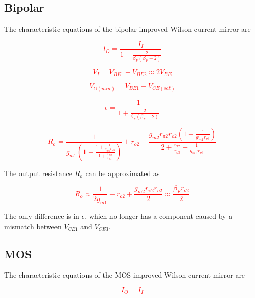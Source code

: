 \subsection{Bipolar}
The characteristic equations of the bipolar improved Wilson current mirror are

\textcolor{red}{
\begin{equation}I_{O} = \frac{I_{I}}{1+\frac{2}{\beta_{F} (\beta_{F} + 2)}}
\end{equation}
}

\textcolor{red}{
\begin{equation}
V_{I}= V_{BE1} + V_{BE2} \approx 2V_{BE}
\end{equation}
}

\textcolor{red}{
\begin{equation}
V_{O(min)} = V_{BE1} + V_{CE(sat)}
\end{equation}
}

\textcolor{red}{
\begin{equation}
\epsilon = \frac{1}{1+\frac{2}{\beta_{F} (\beta_{F} + 2)}}
\end{equation}
}

\textcolor{red}{
\begin{equation}
R_{o} = \frac{1}{g_{m1}\left(1 + \frac{1+\frac{1}{g_{m1}r_{o3}}}{1+\frac{r_{\pi2}}{r_{o3}}}\right)} + r_{o2} + \frac{g_{m2}r_{\pi2}r_{o2}\left(1+\frac{1}{g_{m1}r_{o3}}\right)}{2 + \frac{r_{\pi2}}{r_{o3}} + \frac{1}{g_{m1}r_{o3}}}
\end{equation}
}

The output resistance $R_{o}$ can be approximated as

\textcolor{red}{
\begin{equation}
R_{o} \approx \frac{1}{2g_{m1}} + r_{o2} + \frac{g_{m2}r_{\pi2}r_{o2}}{2} \approx \frac{\beta_{F} r_{o2}}{2}
\end{equation}
}

The only difference is in $\epsilon$, which no longer has a component caused by a mismatch between $V_{CE1}$ and $V_{CE3}$.

\subsection{MOS}
The characteristic equations of the MOS improved Wilson current mirror are

\textcolor{red}{
\begin{equation}
I_{O} = I_{I}
\end{equation}
}

